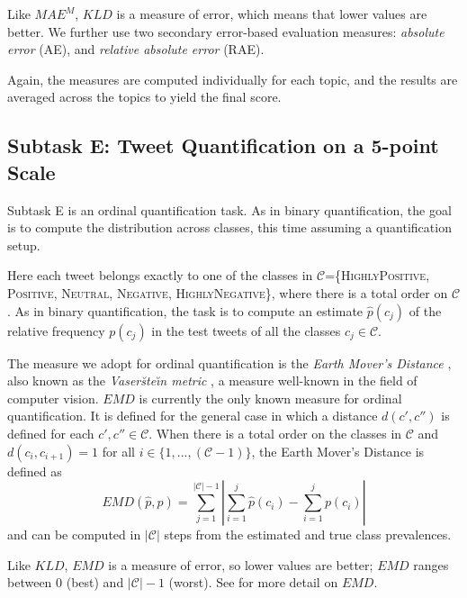\documentclass[11pt,a4paper]{article}
\begin{document}
Like $MAE^{M}$, $KLD$ is a measure of error, which means that lower values are better. We further use two secondary error-based evaluation measures: \emph{absolute error} (AE), and \emph{relative absolute error} (RAE).

Again, the measures are computed individually for each topic, and the results are averaged across the topics to yield the final score.


\subsection{Subtask E: Tweet Quantification on a 5-point Scale} 

Subtask E is an ordinal quantification task. As in binary quantification, the goal is to compute the distribution across classes, this time assuming a quantification setup.

Here each tweet belongs exactly to one of the classes in
$\mathcal{C}$=\{\textsc{HighlyPositive}, \textsc{Positive},
\textsc{Neutral}, \textsc{Negative}, \textsc{HighlyNegative}\}, where
there is a total order on $\mathcal{C}$. As in binary quantification,
the task is to compute an estimate $\hat{p}(c_{j})$ of the relative
frequency $p(c_{j})$ in the test tweets of all the classes $c_{j}\in
\mathcal{C}$.

The measure we adopt for ordinal quantification is the \emph{Earth Mover's Distance}
\cite{Rubner:2000fk}, also known as the \emph{Vaser\u{s}te\u{\i}n
metric} \cite{Ruschendorf:2001mz}, a measure well-known in the field
of computer vision. $EMD$ is currently the only known measure for
ordinal quantification. It is defined for the general case in
which a distance $d(c',c'')$ is defined for each
$c',c''\in\mathcal{C}$. When there is a total order on the classes in
$\mathcal{C}$ and $d(c_i,c_{i+1})=1$ for all
$i\in\{1,...,(\mathcal{C}-1)\}$, the Earth Mover's Distance is defined as
\begin{equation}
  \label{eq:EMD}
  EMD(\hat{p},p) = \sum_{j=1}^{|\mathcal{C}|-1}|\sum_{i=1}^{j}\hat{p}(c_{i})-\sum_{i=1}^{j}p(c_{i})|
\end{equation}
\noindent and can be computed in $|\mathcal{C}|$ steps from the
estimated and true class prevalences.

Like $KLD$, $EMD$ is a measure of error, so lower values are better; $EMD$ ranges between 0 (best) and
$|\mathcal{C}|-1$ (worst). See \cite{Esuli:2010fk} for more detail on $EMD$.
\end{document}
